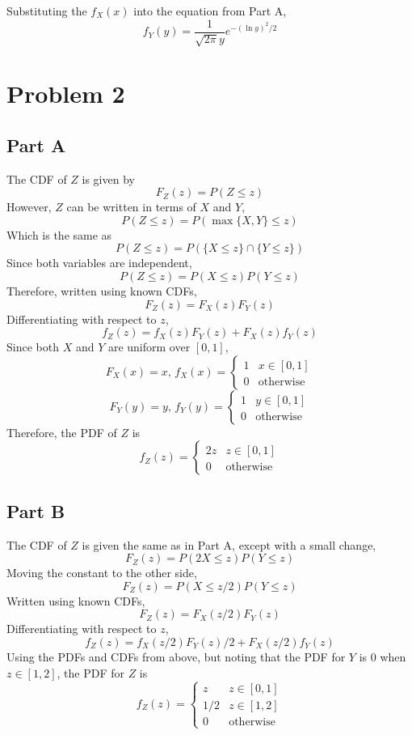 \documentclass{article}
\begin{document}
Substituting the $f_X(x)$ into the equation from Part A,
$$ f_Y(y) = \frac{1}{\sqrt{2 \pi} y} e^{-(\ln y)^2 / 2} $$

\section*{Problem 2}

\subsection*{Part A}

The CDF of $Z$ is given by
$$ F_Z(z) = P(Z \leq z) $$
However, $Z$ can be written in terms of $X$ and $Y$,
$$ P(Z \leq z) = P(\max\{X, Y\} \leq z) $$
Which is the same as
$$ P(Z \leq z) = P(\{X \leq z\} \cap \{Y \leq z\}) $$
Since both variables are independent,
$$ P(Z \leq z) = P(X \leq z) P(Y \leq z) $$
Therefore, written using known CDFs,
$$ F_Z(z) = F_X(z) F_Y(z) $$
Differentiating with respect to $z$,
$$ f_Z(z) = f_X(z) F_Y(z) + F_X(z) f_Y(z) $$
Since both $X$ and $Y$ are uniform over $[0, 1]$,
$$ F_X(x) = x,\, f_X(x) = \begin{cases}
  1 & x \in [0, 1] \\
  0 & \mathrm{otherwise}
\end{cases} $$
$$ F_Y(y) = y,\, f_Y(y) = \begin{cases}
  1 & y \in [0, 1] \\
  0 & \mathrm{otherwise}
\end{cases} $$
Therefore, the PDF of $Z$ is
$$ f_Z(z) = \begin{cases}
  2 z & z \in [0, 1] \\
  0 & \mathrm{otherwise}
\end{cases} $$

\subsection*{Part B}

The CDF of $Z$ is given the same as in Part A, except with a small change,
$$ F_Z(z) = P(2X \leq z) P(Y \leq z) $$
Moving the constant to the other side,
$$ F_Z(z) = P(X \leq z / 2) P(Y \leq z) $$
Written using known CDFs,
$$ F_Z(z) = F_X(z / 2) F_Y(z) $$
Differentiating with respect to $z$,
$$ f_Z(z) = f_X(z / 2) F_Y(z) / 2 + F_X(z / 2) f_Y(z) $$
Using the PDFs and CDFs from above, but noting that the PDF for $Y$ is $0$
when $z \in [1, 2]$, the PDF for $Z$ is
$$ f_Z(z) = \begin{cases}
  z & z \in [0, 1] \\
  1 / 2 & z \in [1, 2] \\
  0 & \mathrm{otherwise}
\end{cases} $$
\end{document}
